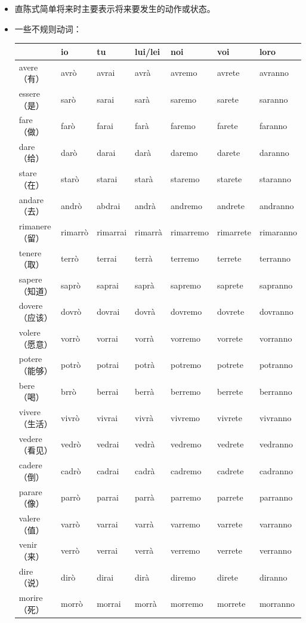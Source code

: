 \documentclass[UTF8,a4paper,titlepage,10pt]{report}
\begin{document}
\begin{enumerate}
\begin{itemize}
\item 直陈式简单将来时主要表示将来要发生的动作或状态。
\item 一些不规则动词：
\begin{center}
\begin{tabular}{lllllll}
 & io & tu & lui/lei & noi & voi & loro\\
\hline
avere（有） & avrò & avrai & avrà & avremo & avrete & avranno\\
essere（是） & sarò & sarai & sarà & saremo & sarete & saranno\\
fare（做） & farò & farai & farà & faremo & farete & faranno\\
dare（给） & darò & darai & darà & daremo & darete & daranno\\
stare（在） & starò & starai & starà & staremo & starete & staranno\\
andare（去） & andrò & abdrai & andrà & andremo & andrete & andranno\\
rimanere（留） & rimarrò & rimarrai & rimarrà & rimarremo & rimarrete & rimaranno\\
tenere（取） & terrò & terrai & terrà & terremo & terrete & terranno\\
sapere（知道） & saprò & saprai & saprà & sapremo & saprete & sapranno\\
dovere（应该） & dovrò & dovrai & dovrà & dovremo & dovrete & dovranno\\
volere（愿意） & vorrò & vorrai & vorrà & vorremo & vorrete & vorranno\\
potere（能够） & potrò & potrai & potrà & potremo & potrete & potranno\\
bere（喝） & brrò & berrai & berrà & berremo & berrete & berranno\\
vivere（生活） & vivrò & vivrai & vivrà & vivremo & vivrete & vivranno\\
vedere（看见） & vedrò & vedrai & vedrà & vedremo & vedrete & vedranno\\
cadere（倒） & cadrò & cadrai & cadrà & cadremo & cadrete & cadranno\\
parare（像） & parrò & parrai & parrà & parremo & parrete & parranno\\
valere（值） & varrò & varrai & varrà & varremo & varrete & varranno\\
venir（来） & verrò & verrai & verrà & verremo & verrete & verranno\\
dire（说） & dirò & dirai & dirà & diremo & direte & diranno\\
morire（死） & morrò & morrai & morrà & morremo & morrete & morranno\\
\end{tabular}
\end{center}
\end{itemize}


\end{enumerate}
\end{document}
